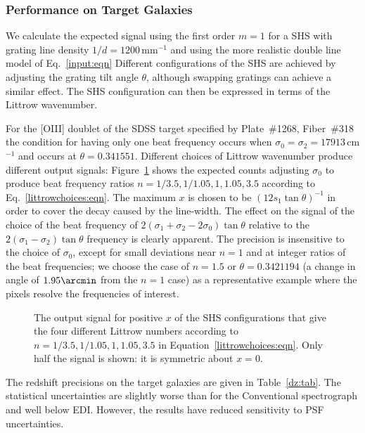 \documentclass[preprint]{aastex}
\begin{document}
\subsubsection{Performance on Target Galaxies}

We calculate the expected signal using the first order $m=1$ for a SHS with grating line density $1/d=1200$\,mm$^{-1}$
and using the more realistic double line model of Eq.~\ref{input:eqn}
Different configurations of the SHS are achieved by adjusting the grating tilt angle $\theta$, although swapping
gratings can achieve a similar effect.
The SHS configuration can then be expressed in terms of the Littrow wavenumber.

For the [OIII] doublet of the
SDSS target specified by Plate~\#1268, Fiber~\#318 
the condition for having only one beat frequency occurs when $\sigma_0=\sigma_2=17913$\,cm$^{-1}$ and
occurs at $\theta=0.341551$.
Different choices of Littrow wavenumber
produce different output signals:
Figure~\ref{shscounts:fig} shows the expected counts adjusting $\sigma_0$ to produce beat frequency ratios
$n=1/3.5,1/1.05,1,1.05,3.5$ according to Eq.\ \ref{littrowchoices:eqn}.
The maximum $x$ is chosen to be $(12s_1\tan{\theta})^{-1}$ in order to cover the decay caused by the line-width.
The effect on the signal
of the choice of the beat frequency of $2(\sigma_1+\sigma_2-2\sigma_0)\tan{\theta}$ relative to the $2(\sigma_1-\sigma_2)\tan{\theta}$ frequency
is clearly apparent.
The precision is insensitive to the choice of $\sigma_0$, except
for small deviations near $n=1$ and at integer ratios of the beat frequencies; we choose
the case of $n=1.5$ or $\theta = 0.3421194$ (a change in angle of $1.95 \arcmin$ from the $n=1$ case)
as a representative example where the pixels resolve the frequencies of interest.

\begin{figure}[t]
   \centering
   \caption{The output signal for positive $x$ of the  SHS configurations that give the four different
   Littrow numbers according to
   $n=1/3.5,1/1.05,1,1.05,3.5$  in Equation~\ref{littrowchoices:eqn}. Only half the signal is shown: it is
   symmetric about $x=0$.\label{shscounts:fig}}
\end{figure}

The redshift precisions on the target galaxies are given in Table~\ref{dz:tab}.  The statistical uncertainties are slightly worse than for
the Conventional spectrograph and well below EDI.  However, the results have reduced sensitivity to PSF uncertainties.
\end{document}
